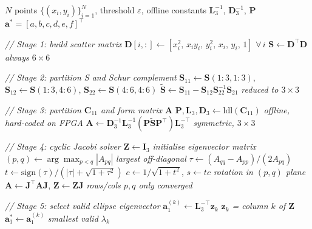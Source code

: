\documentclass[colorlinks,upint,subscriptcorrection,varvw,hyphenate,balance,greek,russian,vietnamese,german]{asmeconf} %
\begin{document}
\begin{algorithm}[h]
	\caption{Direct Ellipse Fitting Pipeline}
	\label{alg:ellipse}
	\begin{algorithmic}[1]
		\small
		\Require $N$ points $\{(x_i,y_i)\}_{i=1}^{N}$,\;
		threshold $\varepsilon$,\;
		offline constants $\mathbf{L}_3^{-1}$,
		$\mathbf{D}_3^{-1}$, $\mathbf{P}$
		\Ensure  $\mathbf{a}^* = [a,b,c,d,e,f]^\top$
		
		\Statex \textit{// Stage 1: build scatter matrix}
		\State $\mathbf{D}[i,:]\!\leftarrow\!
		[x_i^2,\,x_iy_i,\,y_i^2,\,x_i,\,y_i,\,1]$
		\hfill $\forall\, i$
		\State $\mathbf{S} \leftarrow \mathbf{D}^\top\mathbf{D}$
		\hfill \textit{always $6\times6$}
		
		\Statex \textit{// Stage 2: partition S and Schur complement}
		\State $\mathbf{S}_{11}\!\leftarrow\!\mathbf{S}(1{:}3,1{:}3)$,\;
		$\mathbf{S}_{12}\!\leftarrow\!\mathbf{S}(1{:}3,4{:}6)$,\;
		$\mathbf{S}_{22}\!\leftarrow\!\mathbf{S}(4{:}6,4{:}6)$
		\State $\widetilde{\mathbf{S}} \leftarrow
		\mathbf{S}_{11} -
		\mathbf{S}_{12}\mathbf{S}_{22}^{-1}\mathbf{S}_{21}$
		\hfill \textit{reduced to $3\times3$}
		
		\Statex \textit{// Stage 3: partition $\mathbf{C}_{11}$
			and form matrix $\mathbf{A}$}
		\State $\mathbf{P},\mathbf{L}_3,\mathbf{D}_3 \leftarrow
		\mathrm{ldl}(\mathbf{C}_{11})$
		\hfill \textit{offline, hard-coded on FPGA}
		\State $\mathbf{A} \leftarrow
		\mathbf{D}_3^{-1}\mathbf{L}_3^{-1}
		(\mathbf{P}\widetilde{\mathbf{S}}\mathbf{P}^\top)
		\mathbf{L}_3^{-\top}$
		\hfill \textit{symmetric, $3\times3$}
		
		\Statex \textit{// Stage 4: cyclic Jacobi solver}
		\State $\mathbf{Z} \leftarrow \mathbf{I}_3$
		\hfill \textit{initialise eigenvector matrix}
		\Repeat
		\State $(p,q)\leftarrow
		\arg\max_{p<q}|A_{pq}|$
		\hfill \textit{largest off-diagonal}
		\State $\tau \leftarrow
		(A_{qq}-A_{pp})/(2A_{pq})$
		\State $t \leftarrow
		\mathrm{sign}(\tau)/
		(|\tau|+\sqrt{1+\tau^2})$
		\State $c \leftarrow 1/\sqrt{1+t^2}$,\;
		$s \leftarrow tc$
		\hfill \textit{rotation in $(p,q)$ plane}
		\State $\mathbf{A}\leftarrow
		\mathbf{J}^\top\mathbf{A}\mathbf{J}$,\;
		$\mathbf{Z}\leftarrow\mathbf{Z}\mathbf{J}$
		\hfill \textit{rows/cols $p,q$ only}
		\hfill \textit{converged}
		
		\Statex \textit{// Stage 5: select valid ellipse eigenvector}
		\State $\mathbf{a}_1^{(k)}\leftarrow
		\mathbf{L}_3^{-\top}\mathbf{z}_k$
		\hfill \textit{$\mathbf{z}_k$ = column $k$ of $\mathbf{Z}$}
		\State $\mathbf{a}_1^*\leftarrow
		\mathbf{a}_1^{(k)}$
		\hfill \textit{smallest valid $\lambda_k$}
		\EndIf
		\EndFor
		

\end{algorithmic}
\end{algorithm}
\end{document}
